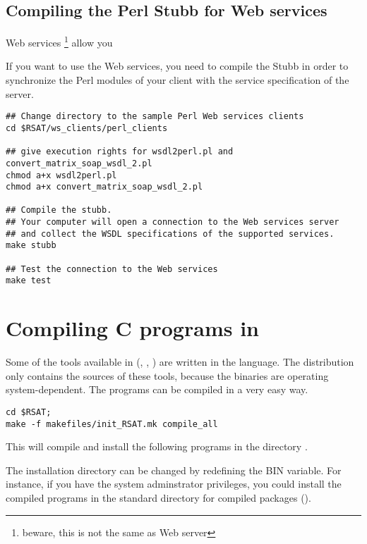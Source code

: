 \documentclass[12pt,a4paper, oneside]{scrreprt} %
\begin{document}
\section{Compiling the Perl Stubb for Web services}

Web services \footnote{beware, this is not the same as Web server} allow you

If you want to use the Web services, you need to compile the Stubb in
order to synchronize the Perl modules of your client with the service
specification of the server.

\begin{lstlisting}
## Change directory to the sample Perl Web services clients
cd $RSAT/ws_clients/perl_clients

## give execution rights for wsdl2perl.pl and convert_matrix_soap_wsdl_2.pl
chmod a+x wsdl2perl.pl
chmod a+x convert_matrix_soap_wsdl_2.pl

## Compile the stubb.
## Your computer will open a connection to the Web services server 
## and collect the WSDL specifications of the supported services.
make stubb

## Test the connection to the Web services
make test
\end{lstlisting}



\chapter{Compiling C programs in \RSAT}

Some of the tools available in \RSAT (,
, ) are written in the
 language. The distribution only contains the sources of
these tools, because the binaries are operating system-dependent. The
programs can be compiled in a very easy way.

\begin{lstlisting}
cd $RSAT;
make -f makefiles/init_RSAT.mk compile_all
\end{lstlisting}

This will compile and install the following programs in the directory
. 

The installation directory can be changed by redefining the BIN
variable. For instance, if you have the system adminstrator
privileges, you could install the compiled programs in the standard
directory for compiled packages ().
\end{document}
